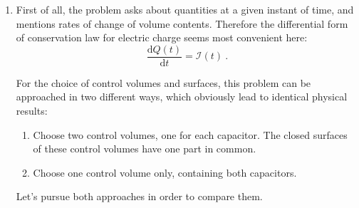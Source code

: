 \documentclass[a4paper,12pt,%
onecolumn,oneside,%
british%
]{memoir}
\newcommand*{\di}{\mathrm{d}}%
\renewcommand*{\|}[1][]{\nonscript\:#1\vert\nonscript\:\mathopen{}}
\newcommand*{\yti}{t_{0}}
\newcommand*{\ytf}{t_{1}}
\newcommand*{\yN}{N}
\newcommand*{\yJ}{J}
\newcommand*{\ya}{\varAlpha}
\newcommand*{\yQ}{Q}%
\newcommand*{\yI}{\mathcal{I}}
\begin{document}
\begin{enumerate}[exerc,itemsep=1em]
Using the balance law we finally find the amount of water after \qty{10}{s}:
  \begin{equation*}
    \begin{split}
      \yN(\ytf) &= \yN(\yti) + \int_{\yti}^{\ytf}\!\!\yJ(t)\, \di t
      + \int_{\yti}^{\ytf}\!\!\ya(t)\, \di t
      \\&= \qty{0}{\mol} -\qty{1}{mol} + \qty{20}{mol}
      = \qty{19}{mol} \ .
    \end{split}
  \end{equation*}


\item First of all, the problem asks about quantities at a given instant of time, and mentions rates of change of volume contents. Therefore the differential form of conservation law for electric charge seems most convenient here:
  \begin{equation*}
    \frac{\di\yQ(t)}{\di t} = \yI(t) \ .
  \end{equation*}

  For the choice of control volumes and surfaces, this problem can be approached in two different ways, which obviously lead to identical physical results:
  \begin{enumerate}[label=(\arabic*)]
  \item Choose two control volumes, one for each capacitor. The closed surfaces of these control volumes have one part in common.
  \item Choose one control volume only, containing both capacitors.
  \end{enumerate}
  Let's pursue both approaches in order to compare them.


\end{enumerate}
\end{document}
